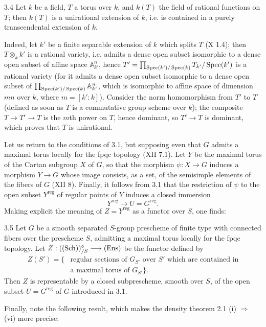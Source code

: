 \begin{lemma}{3.4}\label{XIII.3.4}
Let $k$ be a field, $T$ a torus over $k$, and $k(T)$ the field of rational
functions on $T$; then $k(T)$ is a unirational extension of $k$, i.e.
is contained in a purely transcendental extension of $k$.
\end{lemma}
Indeed, let $k'$ be a finite separable extension of $k$ which splits $T$ (X 1.4); then $T\otimes_k k'$
is a rational variety, i.e. admits a dense open subset isomorphic to a
dense open subset of affine space $\mathbb A^n_{k'}$, hence
$T'=\prod_{\operatorname{Spec}(k')/\operatorname{Spec}(k)}T_{k'}/\operatorname{Spec}(k')$ is a rational variety
(for it admits a dense open subset isomorphic to a dense open subset
of $\prod_{\operatorname{Spec}(k')/\operatorname{Spec}(k)}\mathbb A^n_{k'}$, which is isomorphic to
affine space of dimension $mn$ over $k$, where $m=[k':k]$). Consider
the norm homomorphism from $T'$ to $T$ (defined as soon as $T$ is a
commutative group scheme over $k$); the composite $T\to T'\to T$ is
the $m$th power on $T$, hence dominant, so $T'\to T$ is dominant,
which proves that $T$ is unirational.

Let us return to the conditions of 3.1, but supposing even that $G$
admits a maximal torus locally for the fpqc topology (XII 7.1). Let
$Y$ be the maximal torus of the Cartan subgroup $X$ of $G$, so that
the morphism $\psi:X\to G$ induces a morphism $Y\to G$ whose image
consists, as a set, of the semisimple elements of the fibers of $G$
(XII 8). Finally, it follows from 3.1 that the restriction of $\psi$
to the open subset $Y^{\mathrm{reg}}$ of regular points of $Y$ induces
a closed immersion
\[
 Y^{\mathrm{reg}}\to U=G^{\mathrm{reg}}.
\]
Making explicit the meaning of $Z=Y^{\mathrm{reg}}$ as a functor over
$S$, one finds:
\begin{corollary}{3.5}\label{XIII.3.5}
Let $G$ be a smooth separated $S$-group prescheme of finite type with
connected fibers over the prescheme $S$, admitting a maximal torus
locally for the fpqc topology. Let $Z:(\textup{(Sch)})^\circ_{/S}\longrightarrow\textup{(Ens)}$ be the
functor defined by
\[
\begin{aligned}
 Z(S')=\{&\text{regular sections of }G_{S'}\text{ over }S'\text{ which are
 contained in}\\
 &\text{a maximal torus of }G_{S'}\}.
\end{aligned}
\]
Then $Z$ is representable by a closed subprescheme, smooth over $S$,
of the open subset $U=G^{\mathrm{reg}}$ of $G$ introduced in 3.1.
\end{corollary}
Finally, note the following result, which makes the density theorem
2.1 (i) $\Rightarrow$ (vi) more precise:

